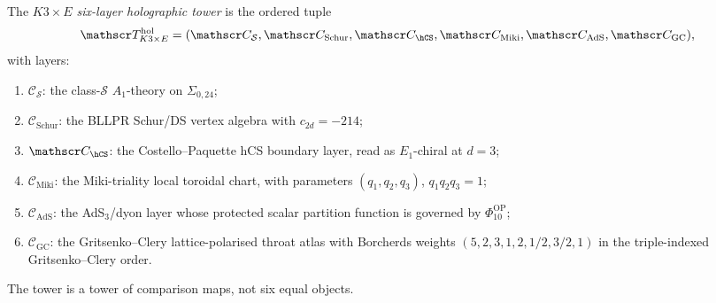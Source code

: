\begin{definition}
\label{def:k3e-six-layer-holographic-tower}
The \emph{\(K3\times E\) six-layer holographic tower} is the ordered
tuple
\[
\mathscr T_{K3\times E}^{\mathrm{hol}}
=
(\mathscr C_{\mathcal S},\mathscr C_{\mathrm{Schur}},
\mathscr C_{\hCS},\mathscr C_{\mathrm{Miki}},
\mathscr C_{\mathrm{AdS}},\mathscr C_{\mathrm{GC}}),
\]
with layers:
\begin{enumerate}[label=\textup{(\arabic*)}]
\item \(\mathscr C_{\mathcal S}\): the class-\(\mathcal S\)
\(A_1\)-theory on \(\Sigma_{0,24}\);
\item \(\mathscr C_{\mathrm{Schur}}\): the BLLPR Schur/DS vertex
algebra with \(c_{2d}=-214\);
\item \(\mathscr C_{\hCS}\): the Costello--Paquette hCS boundary layer,
read as \(E_1\)-chiral at \(d=3\);
\item \(\mathscr C_{\mathrm{Miki}}\): the Miki-triality local toroidal
chart, with parameters \((q_1,q_2,q_3)\), \(q_1q_2q_3=1\);
\item \(\mathscr C_{\mathrm{AdS}}\): the AdS\(_3\)/dyon layer whose
protected scalar partition function is governed by
\(\Phi_{10}^{\mathrm{OP}}\);
\item \(\mathscr C_{\mathrm{GC}}\): the Gritsenko--Clery
lattice-polarised throat atlas with Borcherds weights
\((5,2,3,1,2,1/2,3/2,1)\) in the triple-indexed
Gritsenko--Clery order.
\end{enumerate}
The tower is a tower of comparison maps, not six equal objects.
\end{definition}

